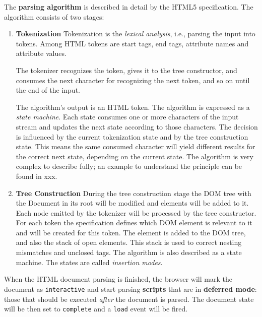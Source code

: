 \documentclass[a4paper, justified, notoc]{tufte-handout} %
\begin{document}
The \textbf{parsing algorithm} is described in detail by the HTML5 specification. The algorithm consists of two stages: \begin{enumerate}
	\item \textbf{Tokenization} \newline 
		Tokenization is the \emph{lexical analysis}, i.e., parsing the input into tokens. Among HTML tokens are start tags, end tags, attribute names and attribute values.

The tokenizer recognizes the token, gives it to the tree constructor, and consumes the next character for recognizing the next token, and so on until the end of the input.

The algorithm's output is an HTML token. The algorithm is expressed as a \emph{state machine}. Each state consumes one or more characters of the input stream and updates the next state according to those characters. The decision is influenced by the current tokenization state and by the tree construction state. This means the same consumed character will yield different results for the correct next state, depending on the current state. The algorithm is very complex to describe fully; an example to understand the principle can be found in xxx.

	\item \textbf{Tree Construction} \newline
	During the tree construction stage the DOM tree with the Document in its root will be modified and elements will be added to it. Each node emitted by the tokenizer will be processed by the tree constructor. For each token the specification defines which DOM element is relevant to it and will be created for this token. The element is added to the DOM tree, and also the stack of open elements. This stack is used to correct nesting mismatches and unclosed tags. The algorithm is also described as a state machine. The states are called \emph{insertion modes}.
\end{enumerate} 

When the HTML document parsing is finished, the browser will mark the document as \texttt{interactive} and start parsing \textbf{scripts} that are in \textbf{deferred mode}: those that should be executed \emph{after} the document is parsed. The document state will be then set to \texttt{complete} and a \texttt{load} event will be fired.
\end{document}
